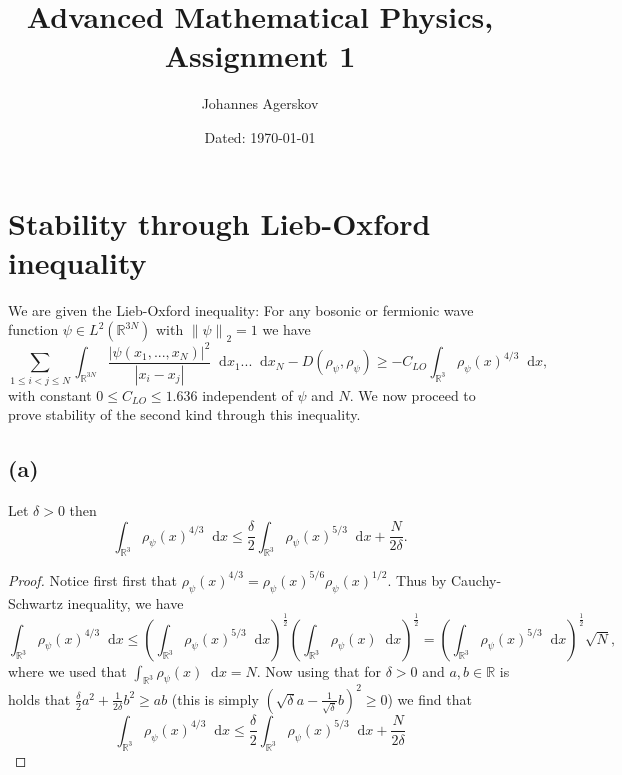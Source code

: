 \documentclass[a4paper,11pt]{article}
\author{Johannes Agerskov}
\date{Dated: \today}
\title{Advanced Mathematical Physics, Assignment 1}
\newcommand{\norm}[1]{\left\lVert #1 \right\rVert}
\newcommand{\abs}[1]{\left\lvert #1 \right\rvert}
\newcommand*\diff{\mathop{}\!\mathrm{d}}
\newcommand{\R}{\mathbb{R}}
\numberwithin{equation}{section}
\begin{document}
	\maketitle

\section{Stability through Lieb-Oxford inequality}
We are given the Lieb-Oxford inequality: For any bosonic or fermionic wave function $ \psi\in L^2(\R^{3N}) $ with $ \norm{\psi}_2=1 $ we have \begin{equation}
\sum_{1\leq i< j\leq N}\int_{\R^{3N}}\frac{\abs{\psi(x_1,...,x_N)}^2}{\abs{x_i-x_j}}\diff x_1...\diff x_N-D(\rho_\psi,\rho_\psi)\geq-C_{LO}\int_{\R^3}\rho_\psi(x)^{4/3}\diff x,
\end{equation}  
with constant $ 0\leq C_{LO}\leq1.636 $ independent of $ \psi $ and $ N $. We now proceed to prove stability of the second kind through this inequality.
\subsection*{(a)}
Let $ \delta>0 $ then \begin{equation}
\int_{\R^3}\rho_\psi(x)^{4/3}\diff x\leq\frac{\delta}{2}\int_{\R^3}\rho_{\psi}(x)^{5/3}\diff x+\frac{N}{2\delta}.
\end{equation}
\begin{proof}
	Notice first first that $ \rho_{\psi}(x)^{4/3}=\rho_{\psi}(x)^{5/6}\rho_{\psi}(x)^{1/2} $. Thus by Cauchy-Schwartz inequality, we have \begin{equation}
	\int_{\R^3}\rho_\psi(x)^{4/3}\diff x\leq\left(\int_{\R^3}\rho_\psi(x)^{5/3}\diff x\right)^{\frac{1}{2}}\left(\int_{\R^3}\rho_\psi(x)\diff x\right)^{\frac{1}{2}}=\left(\int_{\R^3}\rho_\psi(x)^{5/3}\diff x\right)^{\frac{1}{2}}\sqrt{N},
	\end{equation}
	where we used that $ \int_{\R^3}\rho_\psi(x)\diff x=N $. Now using that for $ \delta>0 $ and $ a,b\in \R $ is holds that $ \frac{\delta}{2}a^2+\frac{1}{2\delta}b^2\geq ab $ (this is simply $ (\sqrt{\delta} a-\frac{1}{\sqrt{\delta}}b)^2\geq0 $) we find that \begin{equation}
	\int_{\R^3}\rho_\psi(x)^{4/3}\diff x\leq\frac{\delta}{2}\int_{\R^3}\rho_\psi(x)^{5/3}\diff x+\frac{N}{2\delta}
	\end{equation}
\end{proof}
\end{document}
